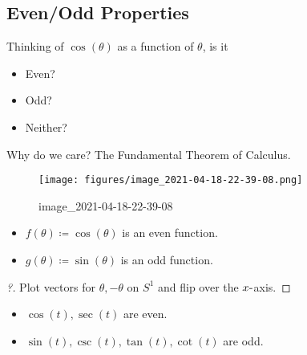\hypertarget{evenodd-properties}{%
\subsection{Even/Odd Properties}\label{evenodd-properties}}

\begin{question}

Thinking of \(\cos(\theta)\) as a function of \(\theta\), is it

\begin{itemize}
\tightlist
\item
  Even?
\item
  Odd?
\item
  Neither?
\end{itemize}

\end{question}

\begin{remark}

Why do we care? The Fundamental Theorem of Calculus.

\begin{figure}
\centering
\texttt{[image: figures/image\_2021-04-18-22-39-08.png]}
\caption{image\_2021-04-18-22-39-08}
\end{figure}

\end{remark}

\begin{proposition}[?]

\envlist

\begin{itemize}
\tightlist
\item
  \(f(\theta) \coloneqq\cos(\theta)\) is an even function.
\item
  \(g(\theta) \coloneqq\sin(\theta)\) is an odd function.
\end{itemize}

\end{proposition}

\begin{proof}[?]

Plot vectors for \(\theta, -\theta\) on \(S^1\) and flip over the
\(x{\hbox{-}}\)axis.

\end{proof}

\begin{corollary}[?]

\envlist

\begin{itemize}
\tightlist
\item
  \(\cos(t), \sec(t)\) are even.
\item
  \(\sin(t), \csc(t), \tan(t), \cot(t)\) are odd.
\end{itemize}

\end{corollary}

